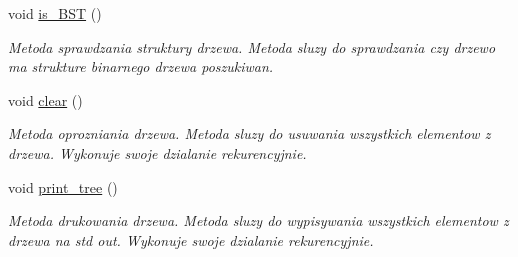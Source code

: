 \begin{DoxyCompactItemize}
void \hyperlink{struct_binary_tree_a2c72362db265ea08bb9ab45e285eb4a1}{is\-\_\-\-B\-S\-T} ()
\begin{DoxyCompactList}\small\item\em Metoda sprawdzania struktury drzewa. Metoda sluzy do sprawdzania czy drzewo ma strukture binarnego drzewa poszukiwan. \end{DoxyCompactList}\item 
void \hyperlink{struct_binary_tree_ad0e4ce622ad8abf4dfb0f051e9c9af92}{clear} ()
\begin{DoxyCompactList}\small\item\em Metoda oprozniania drzewa. Metoda sluzy do usuwania wszystkich elementow z drzewa. Wykonuje swoje dzialanie rekurencyjnie. \end{DoxyCompactList}\item 
void \hyperlink{struct_binary_tree_a8f557920c17957b4ae378727ac898c18}{print\-\_\-tree} ()
\begin{DoxyCompactList}\small\item\em Metoda drukowania drzewa. Metoda sluzy do wypisywania wszystkich elementow z drzewa na std out. Wykonuje swoje dzialanie rekurencyjnie. \end{DoxyCompactList}\end{DoxyCompactItemize}
